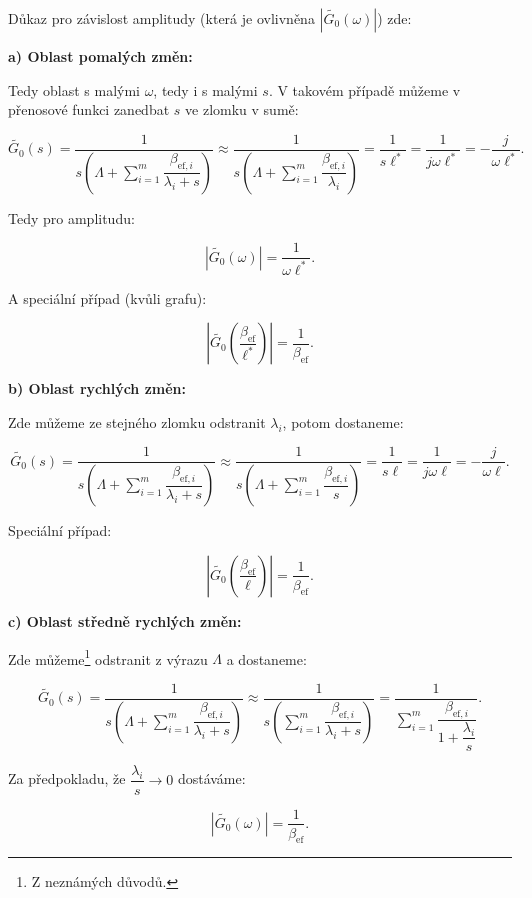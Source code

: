 Důkaz pro závislost amplitudy (která je ovlivněna $|\tilde{G_0}(\omega)|$) zde:

\textbf{a) Oblast pomalých změn:}

Tedy oblast s malými $\omega$, tedy i s malými $s$. V takovém případě můžeme v přenosové funkci zanedbat $s$ ve zlomku v sumě:

$$ \tilde{G_0}(s) = \dfrac{1}{s \left ( \Lambda + \sum_{i=1}^m \dfrac{\beta_{\text{ef},i}}{\lambda_i + s} \right )} \approx \dfrac{1}{s \left ( \Lambda + \sum_{i=1}^m \dfrac{\beta_{\text{ef},i}}{\lambda_i} \right )} = \dfrac{1}{s \ell^*} = \dfrac{1}{j \omega \ell^*} = - \dfrac{j}{\omega \ell^*}. $$

Tedy pro amplitudu:

$$ |\tilde{G_0}(\omega)| = \dfrac{1}{\omega \ell^*}. $$

A speciální případ (kvůli grafu):

$$ \left |\tilde{G_0} \left ( \dfrac{\beta_{\text{ef}}}{\ell^*} \right ) \right | = \dfrac{1}{\beta_{\text{ef}}}. $$

\textbf{b) Oblast rychlých změn:}

Zde můžeme ze stejného zlomku odstranit $\lambda_i$, potom dostaneme:

$$ \tilde{G_0}(s) = \dfrac{1}{s \left ( \Lambda + \sum_{i=1}^m \dfrac{\beta_{\text{ef},i}}{\lambda_i + s} \right )} \approx \dfrac{1}{s \left ( \Lambda + \sum_{i=1}^m \dfrac{\beta_{\text{ef},i}}{s} \right )} = \dfrac{1}{s \ell} = \dfrac{1}{j \omega \ell} = - \dfrac{j}{\omega \ell}. $$

Speciální případ:

$$ \left |\tilde{G_0} \left ( \dfrac{\beta_{\text{ef}}}{\ell} \right ) \right | = \dfrac{1}{\beta_{\text{ef}}}. $$

\textbf{c) Oblast středně rychlých změn:}

Zde můžeme\footnote{Z neznámých důvodů.} odstranit z výrazu $\Lambda$ a dostaneme:

$$ \tilde{G_0}(s) = \dfrac{1}{s \left ( \Lambda + \sum_{i=1}^m \dfrac{\beta_{\text{ef},i}}{\lambda_i + s} \right )} \approx \dfrac{1}{s \left ( \sum_{i=1}^m \dfrac{\beta_{\text{ef},i}}{\lambda_i + s} \right )} = \dfrac{1}{\sum_{i=1}^m \dfrac{\beta_{\text{ef},i}}{1 + \dfrac{\lambda_i}{s}} }. $$

Za předpokladu, že $\dfrac{\lambda_i}{s} \rightarrow 0$ dostáváme:

$$ \left |\tilde{G_0} \left (\omega \right ) \right | = \dfrac{1}{\beta_{\text{ef}}}. $$

